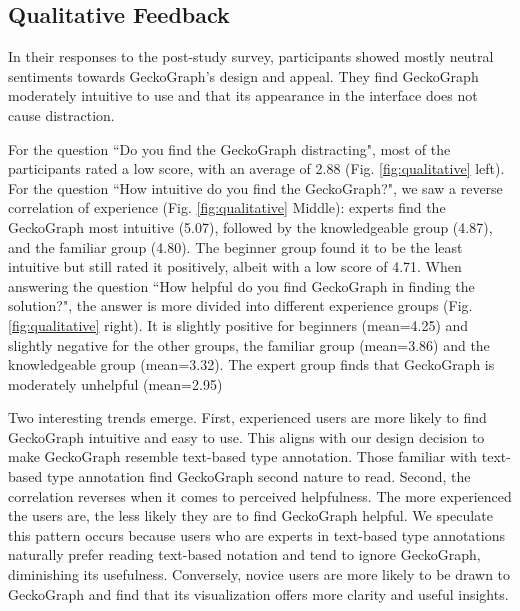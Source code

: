 \documentclass[preprint,12pt]{elsarticle}
\begin{document}
\subsection{Qualitative Feedback}
In their responses to the post-study survey, participants showed mostly neutral sentiments towards GeckoGraph's design and appeal. They find GeckoGraph moderately intuitive to use and that its appearance in the interface does not cause distraction.

For the question ``Do you find the GeckoGraph distracting", most of the participants rated a low score, with an average of 2.88 (Fig. \ref{fig:qualitative} left). For the question ``How intuitive do you find the GeckoGraph?", we saw a reverse correlation of experience (Fig. \ref{fig:qualitative} Middle): experts find the GeckoGraph most intuitive (5.07), followed by the knowledgeable group (4.87), and the familiar group (4.80). The beginner group found it to be the least intuitive but still rated it positively, albeit with a low score of 4.71. 
When answering the question ``How helpful do you find GeckoGraph in finding the solution?", the answer is more divided into different experience groups (Fig. \ref{fig:qualitative} right). It is slightly positive for beginners (mean=4.25) and slightly negative for the other groups, the familiar group (mean=3.86) and the knowledgeable group (mean=3.32). The expert group finds that GeckoGraph is moderately unhelpful (mean=2.95)

Two interesting trends emerge. First, experienced users are more likely to find GeckoGraph intuitive and easy to use. This aligns with our design decision to make GeckoGraph resemble text-based type annotation. Those familiar with text-based type annotation find GeckoGraph second nature to read. Second, the correlation reverses when it comes to perceived helpfulness. The more experienced the users are, the less likely they are to find GeckoGraph helpful. We speculate this pattern occurs because users who are experts in text-based type annotations naturally prefer reading text-based notation and tend to ignore GeckoGraph, diminishing its usefulness. Conversely, novice users are more likely to be drawn to GeckoGraph and find that its visualization offers more clarity and useful insights.


\end{document}
